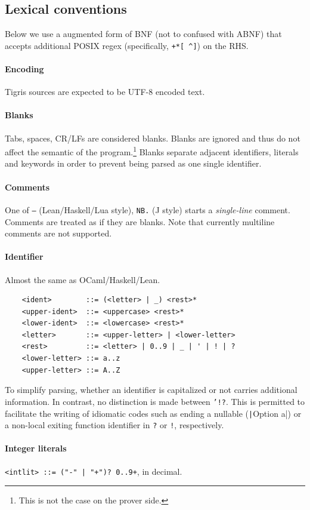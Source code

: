 \documentclass[a4paper, 11pt]{article}
\theoremstyle{remark}\newtheorem*{remark}{Remark}
\theoremstyle{definition}\newtheorem*{definition}{Definition}
\begin{document}
\subsection{Lexical conventions}
Below we use a augmented form of BNF (not to confused with ABNF) that
accepts additional POSIX regex (specifically, \texttt{+*[\,\^\;]}) on the RHS.
\paragraph{Encoding} Tigris sources are expected to be UTF-8 encoded text.
\paragraph{Blanks} Tabs, spaces, CR/LFs are considered blanks. Blanks are ignored
and thus do not affect the semantic of the program.\footnote{This is not the case on the prover side.}
Blanks separate adjacent identifiers, literals and keywords in order to prevent being parsed
as one single identifier.
\paragraph{Comments} One of \texttt{--} (Lean/Haskell/Lua style), \texttt{NB.} (J style) starts a
\emph{single-line} comment. Comments are treated as if they are blanks. Note that currently
multiline comments are not supported.

\paragraph{Identifier} Almost the same as OCaml/Haskell/Lean.
  \begin{verbatim}
    <ident>        ::= (<letter> | _) <rest>*
    <upper-ident>  ::= <uppercase> <rest>*
    <lower-ident>  ::= <lowercase> <rest>*
    <letter>       ::= <upper-letter> | <lower-letter>
    <rest>         ::= <letter> | 0..9 | _ | ' | ! | ?
    <lower-letter> ::= a..z
    <upper-letter> ::= A..Z
  \end{verbatim}
To simplify parsing, whether an identifier is capitalized or not carries additional
information. In contrast, no distinction is made between \texttt{'!?}. This is permitted
to facilitate the writing of idiomatic codes such as ending a nullable
(\texttt|Option a|) or a non-local exiting function identifier
in \texttt{?} or \texttt{!},
respectively.
\paragraph{Integer literals} \texttt{<intlit> ::= ("-" | "+")? 0..9+}, in decimal.
\end{document}
